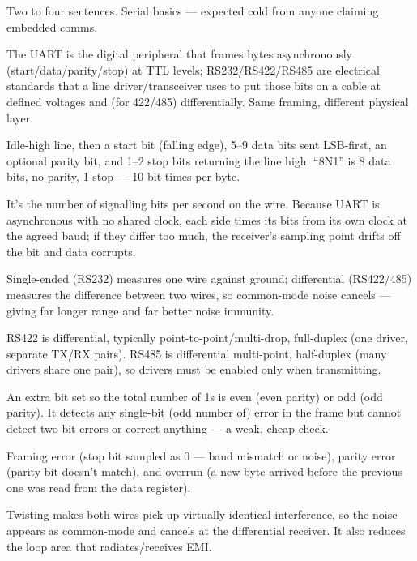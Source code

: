 %
{Two to four sentences. Serial basics --- expected cold from anyone claiming
embedded comms.}

The UART is the digital peripheral that frames bytes asynchronously
(start/data/parity/stop) at TTL levels; RS232/RS422/RS485 are electrical
standards that a line driver/transceiver uses to put those bits on a cable at
defined voltages and (for 422/485) differentially. Same framing, different
physical layer.

Idle-high line, then a start bit (falling edge), 5--9 data bits sent
LSB-first, an optional parity bit, and 1--2 stop bits returning the line high.
``8N1'' is 8 data bits, no parity, 1 stop --- 10 bit-times per byte.

It's the number of signalling bits per second on the wire. Because UART is
asynchronous with no shared clock, each side times its bits from its own clock
at the agreed baud; if they differ too much, the receiver's sampling point
drifts off the bit and data corrupts.

Single-ended (RS232) measures one wire against ground; differential
(RS422/485) measures the difference between two wires, so common-mode noise
cancels --- giving far longer range and far better noise immunity.

RS422 is differential, typically point-to-point/multi-drop, full-duplex (one
driver, separate TX/RX pairs). RS485 is differential multi-point, half-duplex
(many drivers share one pair), so drivers must be enabled only when
transmitting.

An extra bit set so the total number of 1s is even (even parity) or odd (odd
parity). It detects any single-bit (odd number of) error in the frame but
cannot detect two-bit errors or correct anything --- a weak, cheap check.

Framing error (stop bit sampled as 0 --- baud mismatch or noise), parity error
(parity bit doesn't match), and overrun (a new byte arrived before the previous
one was read from the data register).

Twisting makes both wires pick up virtually identical interference, so the
noise appears as common-mode and cancels at the differential receiver. It also
reduces the loop area that radiates/receives EMI.

